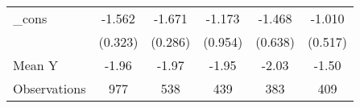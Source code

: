 {\begin{tabular}{l*{5}{c}}
\addlinespace
\_cons      &      -1.562\sym{***}&      -1.671\sym{***}&      -1.173         &      -1.468\sym{**} &      -1.010\sym{*}  \\
            &     (0.323)         &     (0.286)         &     (0.954)         &     (0.638)         &     (0.517)         \\
\midrule
Mean Y      &       -1.96         &       -1.97         &       -1.95         &       -2.03         &       -1.50         \\
Observations&         977         &         538         &         439         &         383         &         409         \\
\bottomrule
\end{tabular}
}
